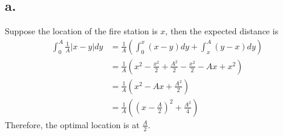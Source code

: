 \documentclass[11pt]{article}
\begin{document}
\subsection*{a.}
Suppose the location of the fire station is $x$, then the expected distance is 
\begin{equation*}
    \begin{aligned}
        \int_0^A \frac{1}{A} |x-y| dy 
        &= \frac{1}{A} \left(\int_0^x (x-y) dy + \int_x^A (y-x) dy \right) \\
        &= \frac{1}{A} \left( x^2 - \frac{x^2}{2} + \frac{A^2}{2} -\frac{x^2}{2} - Ax +x^2\right) \\
        &= \frac{1}{A} \left( x^2 -Ax + \frac{A^2}{2} \right) \\
        &= \frac{1}{A} \left( \left(x-\frac{A}{2}\right)^2 + \frac{A^2}{4}\right)            
    \end{aligned}
\end{equation*}
Therefore, the optimal location is at $\frac{A}{2}$.
\end{document}
